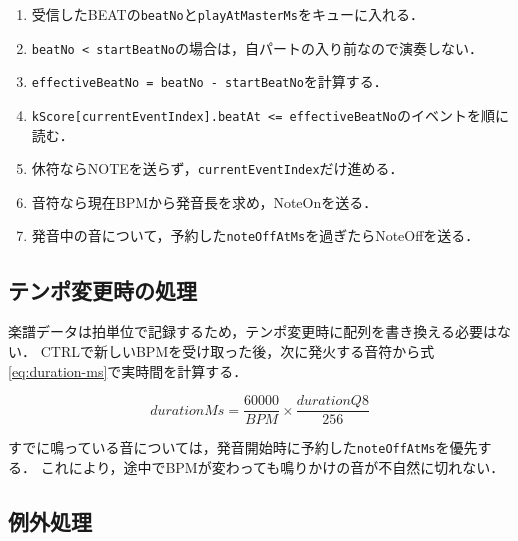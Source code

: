 \documentclass[uplatex,dvipdfmx]{jlreq}
\newcommand{\code}[1]{\texttt{#1}}
\begin{document}
\begin{enumerate}
  \item 受信したBEATの\code{beatNo}と\code{playAtMasterMs}をキューに入れる．
  \item \code{beatNo < startBeatNo}の場合は，自パートの入り前なので演奏しない．
  \item \code{effectiveBeatNo = beatNo - startBeatNo}を計算する．
  \item \code{kScore[currentEventIndex].beatAt <= effectiveBeatNo}のイベントを順に読む．
  \item 休符ならNOTEを送らず，\code{currentEventIndex}だけ進める．
  \item 音符なら現在BPMから発音長を求め，NoteOnを送る．
  \item 発音中の音について，予約した\code{noteOffAtMs}を過ぎたらNoteOffを送る．
\end{enumerate}

\subsection{テンポ変更時の処理}

楽譜データは拍単位で記録するため，テンポ変更時に配列を書き換える必要はない．
CTRLで新しいBPMを受け取った後，次に発火する音符から式\ref{eq:duration-ms}で実時間を計算する．

\begin{equation}
\label{eq:duration-ms}
durationMs = \frac{60000}{BPM} \times \frac{durationQ8}{256}
\end{equation}

すでに鳴っている音については，発音開始時に予約した\code{noteOffAtMs}を優先する．
これにより，途中でBPMが変わっても鳴りかけの音が不自然に切れない．

\subsection{例外処理}
\end{document}

